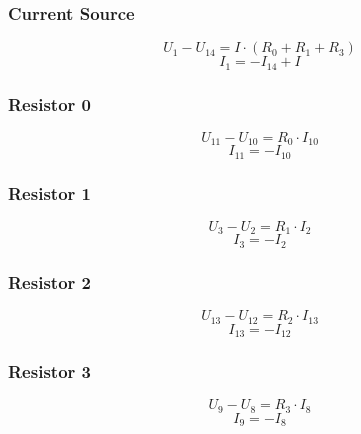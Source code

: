 \documentclass[10pt,a4paper]{article}
\begin{document}
\subsubsection*{Current Source}

\begin{equation*}
  U_{1} - U_{14} = I \cdot (R_{0} + R_{1} + R_{3})
\end{equation*}
\begin{equation*}
  I_{1} = -I_{14} + I
\end{equation*}

\subsubsection*{Resistor 0}

\begin{equation*}
  U_{11} - U_{10} = R_{0} \cdot I_{10}
\end{equation*}
\begin{equation*}
  I_{11} = -I_{10}
\end{equation*}

\subsubsection*{Resistor 1}

\begin{equation*}
  U_{3} - U_{2} = R_{1} \cdot I_{2}
\end{equation*}
\begin{equation*}
  I_{3} = -I_{2}
\end{equation*}

\subsubsection*{Resistor 2}

\begin{equation*}
  U_{13} - U_{12} = R_{2} \cdot I_{13}
\end{equation*}
\begin{equation*}
  I_{13} = -I_{12}
\end{equation*}

\subsubsection*{Resistor 3}

\begin{equation*}
  U_{9} - U_{8} = R_{3} \cdot I_{8}
\end{equation*}
\begin{equation*}
  I_{9} = -I_{8}
\end{equation*}
\end{document}

